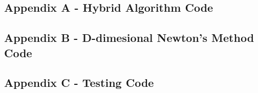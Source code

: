 \documentclass[10pt]{article}
\begin{document}
\subsection*{Appendix A - Hybrid Algorithm Code}


\pagebreak

\subsection*{Appendix B - D-dimesional Newton's Method Code}


\pagebreak

\subsection*{Appendix C - Testing Code}

\end{document}

